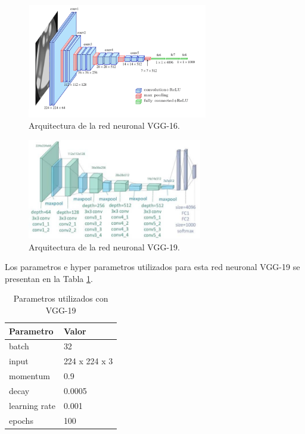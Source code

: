 \documentclass{article}
\begin{document}
	\begin{figure}[H]
		\centering
		\includegraphics[width=0.7\textwidth]{img/vgg16}		
		\caption{Arquitectura de la red neuronal VGG-16.}
		\label{fig:vgg16}
	\end{figure} 
	\begin{figure}[H]
		\centering
		\includegraphics[width=0.68\textwidth]{img/vgg19}		
		\caption{Arquitectura de la red neuronal VGG-19.}
		\label{fig:vgg19}
	\end{figure}

	Los parametros e hyper parametros utilizados para esta red neuronal VGG-19 se presentan en la Tabla \ref{tab:vgg}.
	
	\begin{table}[h]
		\centering		
		\caption{Parametros utilizados con VGG-19}
		\label{tab:vgg}
		\begin{tabular}{ p{3cm} p{3cm}}
			\hline 
			\textbf{Parametro} & \textbf{Valor}   \\
			\hline 
			batch & 32 \\
			input & 224 x 224 x 3 \\
			momentum & 0.9 \\
			decay & 0.0005 \\
			learning rate & 0.001 \\
			epochs & 100 \\
			\hline 
		\end{tabular}
	\end{table}
	
\end{document}
